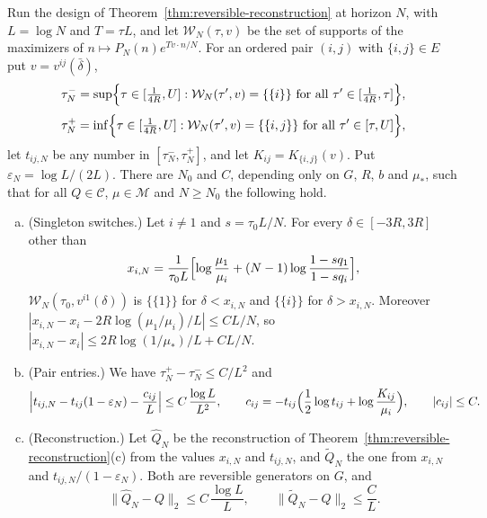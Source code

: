\begin{theorem}\label{thm:finite-horizon}
Run the design of Theorem~\ref{thm:reversible-reconstruction} at horizon $N$,
with $L=\log N$ and $T=\tau L$, and let $\mathcal W_N(\tau,v)$ be the set of
supports of the maximizers of $n\mapsto P_N(n)e^{Tv\cdot n/N}$. For an ordered
pair $(i,j)$ with $\{i,j\}\in E$ put $v=v^{ij}(\bar\delta)$,
\[
 \tau^-_N=\sup\Bigl\{\tau\in[\tfrac1{4R},U]:\mathcal W_N(\tau',v)=\{\{i\}\}\text{ for all }\tau'\in[\tfrac1{4R},\tau]\Bigr\},
\]
\[
 \tau^+_N=\inf\Bigl\{\tau\in[\tfrac1{4R},U]:\mathcal W_N(\tau',v)=\{\{i,j\}\}\text{ for all }\tau'\in[\tau,U]\Bigr\},
\]
let $t_{ij,N}$ be any number in $[\tau^-_N,\tau^+_N]$, and let
$K_{ij}=K_{\{i,j\}}(v)$. Put $\varepsilon_N=\log L/(2L)$. There are $N_0$ and $C$,
depending only on $G$, $R$, $b$ and $\mu_*$, such that for all $Q\in\mathcal C$,
$\mu\in\mathcal M$ and $N\ge N_0$ the following hold.
\begin{enumerate}[(a)]
\item (Singleton switches.) Let $i\ne1$ and $s=\tau_0L/N$. For every
$\delta\in[-3R,3R]$ other than
\[
 x_{i,N}=\frac1{\tau_0L}\Bigl[\log\frac{\mu_1}{\mu_i}+(N-1)\log\frac{1-sq_1}{1-sq_i}\Bigr],
\]
$\mathcal W_N(\tau_0,v^{i1}(\delta))$ is $\{\{1\}\}$ for $\delta<x_{i,N}$ and
$\{\{i\}\}$ for $\delta>x_{i,N}$. Moreover
$|x_{i,N}-x_i-2R\log(\mu_1/\mu_i)/L|\le CL/N$, so
$|x_{i,N}-x_i|\le2R\log(1/\mu_*)/L+CL/N$.
\item (Pair entries.) We have $\tau^+_N-\tau^-_N\le C/L^2$ and
\[
 \Bigl|t_{ij,N}-t_{ij}(1-\varepsilon_N)-\frac{c_{ij}}L\Bigr|\le C\,\frac{\log L}{L^2},\qquad
 c_{ij}=-t_{ij}\Bigl(\frac12\log t_{ij}+\log\frac{K_{ij}}{\mu_i}\Bigr),\qquad|c_{ij}|\le C .
\]
\item (Reconstruction.) Let $\widehat Q_N$ be the reconstruction of
Theorem~\ref{thm:reversible-reconstruction}(c) from the values $x_{i,N}$ and
$t_{ij,N}$, and $\widetilde Q_N$ the one from $x_{i,N}$ and
$t_{ij,N}/(1-\varepsilon_N)$. Both are reversible generators on $G$, and
\[
 \|\widehat Q_N-Q\|_2\le C\,\frac{\log L}L,\qquad\|\widetilde Q_N-Q\|_2\le\frac CL .
\]
\end{enumerate}
\end{theorem}

